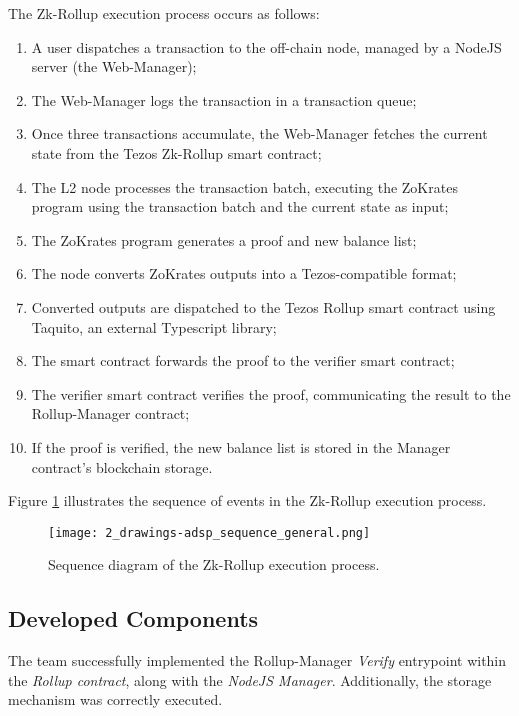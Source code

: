The Zk-Rollup execution process occurs as follows:
\begin{enumerate}
    \item A user dispatches a transaction to the off-chain node, managed by a NodeJS server (the Web-Manager);
    \item The Web-Manager logs the transaction in a transaction queue;
    \item Once three transactions accumulate, the Web-Manager fetches the current state from the Tezos Zk-Rollup smart contract;
    \item The L2 node processes the transaction batch, executing the ZoKrates program using the transaction batch and the current state as input;
    \item The ZoKrates program generates a proof and new balance list;
    \item The node converts ZoKrates outputs into a Tezos-compatible format;
    \item Converted outputs are dispatched to the Tezos Rollup smart contract using Taquito, an external Typescript library;
    \item The smart contract forwards the proof to the verifier smart contract;
    \item The verifier smart contract verifies the proof, communicating the result to the Rollup-Manager contract;
    \item If the proof is verified, the new balance list is stored in the Manager contract's blockchain storage.
\end{enumerate}

Figure \ref{fig:3_drawings-adsp_sequence_general.png} illustrates the sequence of events in the Zk-Rollup execution process.

\begin{figure}[ht]
  \centering
  \texttt{[image: 2\_drawings-adsp\_sequence\_general.png]}
  \caption[Sequence Zk-Rollup]{Sequence diagram of the Zk-Rollup execution process.}  
  \label{fig:3_drawings-adsp_sequence_general.png}
\end{figure} 

\subsection{Developed Components}
The team successfully implemented the Rollup-Manager \textit{Verify} entrypoint within the \textit{Rollup contract}, along with the \textit{NodeJS Manager}. Additionally, the storage mechanism was correctly executed.

